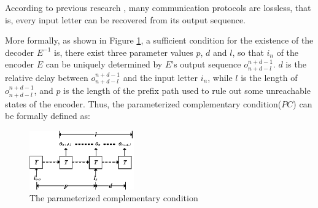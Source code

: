 \documentclass[journal]{IEEEtran}
\begin{document}
According to previous research \cite{ShengYuShen:iccad09,ShengYuShen:tcad,ShengYuShen:fmcad10},
many communication protocols are lossless,
that is,
every input letter can be recovered from its output sequence.

More formally,
as shown in Figure \ref{t1},
a sufficient condition for the existence of the decoder $E^{-1}$ is,
there exist three parameter values $p$, $d$ and $l$,
so that $i_n$ of the encoder $E$ can be uniquely determined by $E$'s output sequence $o_{n+d-l}^{n+d-1}$.
$d$ is the relative delay between $o_{n+d-l}^{n+d-1}$ and the input letter $i_n$,
while $l$ is the length of $o_{n+d-l}^{n+d-1}$,
and $p$ is the length of the prefix path used to rule out some unreachable states of the encoder.
Thus,
the parameterized complementary condition($PC$)\cite{ShengYuShen:iccad09} can be formally defined  as:

\begin{figure}[t]
\begin{center}
\includegraphics[width=0.4\textwidth]{t1}
\end{center}
\caption{The parameterized complementary condition}
  \label{t1}
\end{figure}
\end{document}
